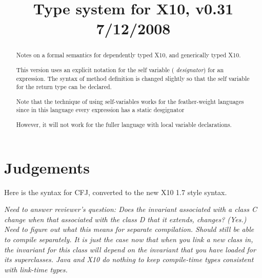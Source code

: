 \documentclass[preprint,nocopyrightspace,9pt]{sigplanconf}
\def\Xten{{\sf X10}}
\def\CFJ{{\sf CFJ}}
\newif\iflncs
\begin{document}
\title{Type system for \Xten, v0.31 7/12/2008}
\iflncs
\author{a}
\else
{}
\fi
\maketitle

\begin{abstract}

Notes on a formal semantics for dependently typed \Xten, and
generically typed \Xten. 

This version uses an explicit notation for the self variable ({\em
designator}) for an expression. The syntax of method definition is
changed slightly so that the self variable for the return type can be
declared.

Note that the technique of using self-variables works for the
feather-weight languages since in this language every expression has a
static desgignator

 However, it will not work for the fuller
language with local variable declarations.

\end{abstract}

\section{Judgements}

Here is the syntax for \CFJ, converted to the new X10 1.7 style
syntax. 

{\em Need to answer reviewer's question: Does the invariant associated
with a class C change when that associated with the class D that it
extends, changes? (Yes.) Need to figure out what this means for
separate compilation. Should still be able to compile separately. It
is just the case now that when you link a new class in, the invariant
for this class will depend on the invariant that you have loaded for
its superclasses. Java and X10 do nothing to keep compile-time types
consistent with link-time types.}
\end{document}
